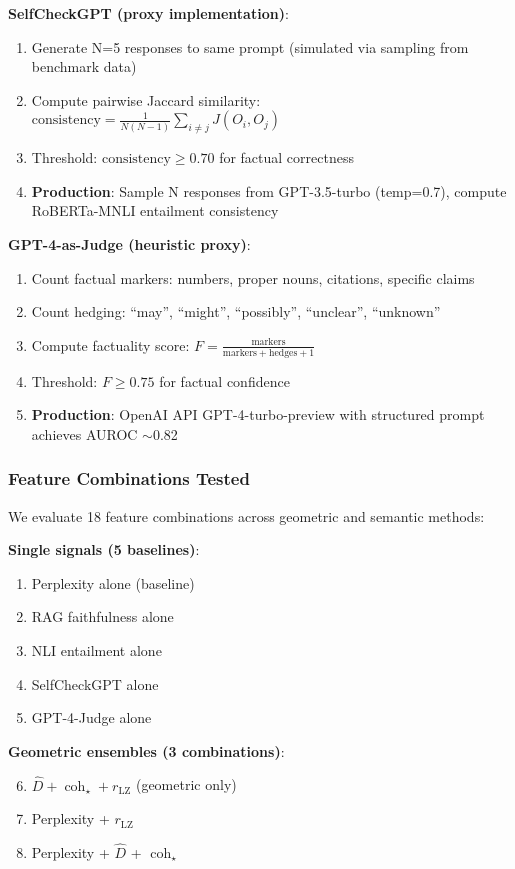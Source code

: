 \documentclass[11pt]{article}
\begin{document}
\textbf{SelfCheckGPT (proxy implementation)}:
\begin{enumerate}
\item Generate N=5 responses to same prompt (simulated via sampling from benchmark data)
\item Compute pairwise Jaccard similarity: $\text{consistency} = \frac{1}{N(N-1)} \sum_{i \neq j} J(O_i, O_j)$
\item Threshold: $\text{consistency} \geq 0.70$ for factual correctness
\item \textbf{Production}: Sample N responses from GPT-3.5-turbo (temp=0.7), compute RoBERTa-MNLI entailment consistency
\end{enumerate}

\textbf{GPT-4-as-Judge (heuristic proxy)}:
\begin{enumerate}
\item Count factual markers: numbers, proper nouns, citations, specific claims
\item Count hedging: ``may'', ``might'', ``possibly'', ``unclear'', ``unknown''
\item Compute factuality score: $F = \frac{\text{markers}}{\text{markers} + \text{hedges} + 1}$
\item Threshold: $F \geq 0.75$ for factual confidence
\item \textbf{Production}: OpenAI API GPT-4-turbo-preview with structured prompt achieves AUROC $\sim$0.82
\end{enumerate}

\subsubsection{Feature Combinations Tested}

We evaluate 18 feature combinations across geometric and semantic methods:

\textbf{Single signals (5 baselines)}:
\begin{enumerate}
\item Perplexity alone (baseline)
\item RAG faithfulness alone
\item NLI entailment alone
\item SelfCheckGPT alone
\item GPT-4-Judge alone
\end{enumerate}

\textbf{Geometric ensembles (3 combinations)}:
\begin{enumerate}
\setcounter{enumi}{5}
\item $\hat{D} + \operatorname{coh}_\star + r_{\text{LZ}}$ (geometric only)
\item Perplexity + $r_{\text{LZ}}$
\item Perplexity + $\hat{D}$ + $\operatorname{coh}_\star$
\end{enumerate}
\end{document}
